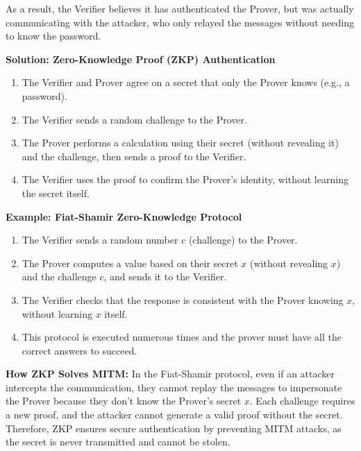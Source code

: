 As a result, the Verifier believes it has authenticated the Prover, but was actually communicating with the attacker, who only relayed the messages without needing to know the password.

\textbf{Solution: Zero-Knowledge Proof (ZKP) Authentication}
\begin{enumerate}
    \item The Verifier and Prover agree on a secret that only the Prover knows (e.g., a password).
    \item The Verifier sends a random challenge to the Prover.
    \item The Prover performs a calculation using their secret (without revealing it) and the challenge, then sends a proof to the Verifier.
    \item The Verifier uses the proof to confirm the Prover's identity, without learning the secret itself.
\end{enumerate}

\textbf{Example: Fiat-Shamir Zero-Knowledge Protocol \cite{fiat1986}}
\begin{enumerate}
    \item The Verifier sends a random number \(c\) (challenge) to the Prover.
    \item The Prover computes a value based on their secret \(x\) (without revealing \(x\)) and the challenge \(c\), and sends it to the Verifier.
    \item The Verifier checks that the response is consistent with the Prover knowing \(x\), without learning \(x\) itself.
    \item This protocol is executed numerous times and the prover must have all the correct answers to succeed.
\end{enumerate}

\textbf{How ZKP Solves MITM:}
In the Fiat-Shamir protocol, even if an attacker intercepts the communication, they cannot replay the messages to impersonate the Prover because they don't know the Prover's secret \(x\). Each challenge requires a new proof, and the attacker cannot generate a valid proof without the secret. Therefore, ZKP ensures secure authentication by preventing MITM attacks, as the secret is never transmitted and cannot be stolen.
